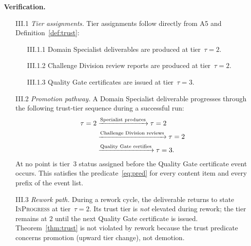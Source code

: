 \documentclass[12pt]{article}
\theoremstyle{definition}
\begin{document}
\medskip
\noindent\textbf{Verification.}
\begin{enumerate}
    \item[III.1] \emph{Tier assignments.}  Tier assignments follow
                 directly from A5 and Definition~\ref{def:trust}:
                 \begin{enumerate}
                     \item[III.1.1] Domain Specialist deliverables are
                                    produced at tier~$\tau = 2$.
                     \item[III.1.2] Challenge Division review reports
                                    are produced at tier~$\tau = 2$.
                     \item[III.1.3] Quality Gate certificates are
                                    issued at tier~$\tau = 3$.
                 \end{enumerate}

    \item[III.2] \emph{Promotion pathway.}  A Domain Specialist
                 deliverable progresses through the following trust-tier
                 sequence during a successful run:
                 \begin{align}
                     \tau = 2
                     &\xrightarrow{\text{Specialist produces}}
                     \tau = 2
                     \notag\\
                     &\xrightarrow{\text{Challenge Division reviews}}
                     \tau = 2
                     \notag\\
                     &\xrightarrow{\text{Quality Gate certifies}}
                     \tau = 3.
                     \notag
                 \end{align}
                 At no point is tier~3 status assigned before the
                 Quality Gate certificate event occurs.  This satisfies
                 the predicate~\eqref{eq:pred} for every content item
                 and every prefix of the event list. \checkmark

    \item[III.3] \emph{Rework path.}  During a rework cycle, the
                 deliverable returns to state \textsc{InProgress} at
                 tier~$\tau = 2$.  Its trust tier is \emph{not}
                 elevated during rework; the tier remains at $2$ until
                 the next Quality Gate certificate is issued.
                 Theorem~\ref{thm:trust} is not violated by rework
                 because the trust predicate concerns promotion (upward
                 tier change), not demotion. \checkmark


\end{enumerate}
\end{document}
